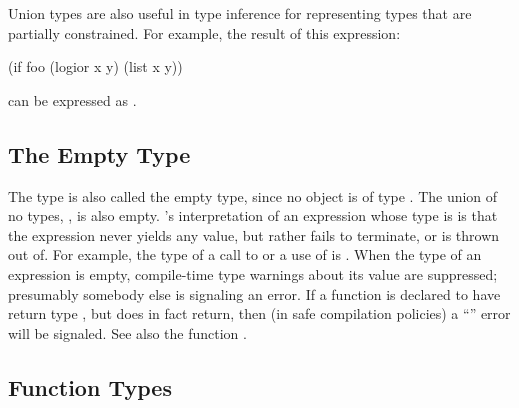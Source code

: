 Union types are also useful in type inference for representing types that are
partially constrained.  For example, the result of this expression:
\begin{lisp}
(if foo
    (logior x y)
    (list x y))
\end{lisp}
can be expressed as .


\subsection{The Empty Type}
\label{empty-type}

The type \false{} is also called the empty type, since no object is of
type \false{}.  The union of no types, , is also empty.
\python{}'s interpretation of an expression whose type is \false{} is
that the expression never yields any value, but rather fails to
terminate, or is thrown out of.  For example, the type of a call to
 or a use of  is \false{}.  When the type of
an expression is empty, compile-time type warnings about its value are
suppressed; presumably somebody else is signaling an error.  If a
function is declared to have return type \false{}, but does in fact
return, then (in safe compilation policies) a ``'' error will be signaled.  See also the function
.


\subsection{Function Types}
\label{function-types}

